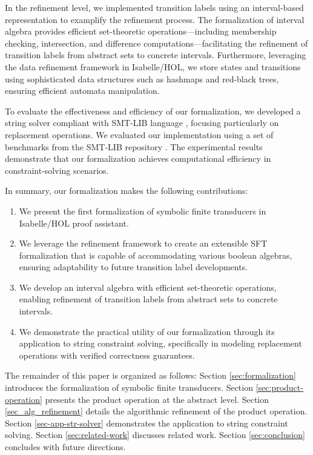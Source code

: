 In the refinement level, we implemented transition labels using an interval-based representation to examplify the refinement process. The formalization of interval algebra provides efficient set-theoretic operations—including membership checking, intersection, and difference computations—facilitating the refinement of transition labels from abstract sets to concrete intervals. Furthermore, leveraging the data refinement framework \cite{DBLP:conf/itp/Lammich13} in Isabelle/HOL, we store states and transitions using sophisticated data structures such as hashmaps and red-black trees, ensuring efficient automata manipulation.

To evaluate the effectiveness and efficiency of our formalization, we developed a string solver compliant with SMT-LIB language \cite{smtlib}, focusing particularly on replacement operations. We evaluated our implementation using a set of benchmarks from the SMT-LIB repository \cite{smtlib_benchmarks}. The experimental results demonstrate that our formalization achieves computational efficiency in constraint-solving scenarios.



In summary, our formalization makes the following contributions:
\begin{enumerate}
\item We present the first formalization of symbolic finite transducers in Isabelle/HOL proof assistant.
\item We leverage the refinement framework to create an extensible SFT formalization that is capable of accommodating various boolean algebras, ensuring adaptability to future transition label developments.
\item We develop an interval algebra with efficient set-theoretic operations, enabling refinement of transition labels from abstract sets to concrete intervals.
\item We demonstrate the practical utility of our formalization through its application to string constraint solving, specifically in modeling replacement operations with verified correctness guarantees.
\end{enumerate}

The remainder of this paper is organized as follows:
Section \ref{sec:formalization} introduces the formalization of symbolic finite transducers.
Section \ref{sec:product-operation} presents the product operation at the abstract level.
Section \ref{sec_alg_refinement} details the algorithmic refinement of the product operation.
Section \ref{sec-app-str-solver} demonstrates the application to string constraint solving.
Section \ref{sec:related-work} discusses related work.
Section \ref{sec:conclusion} concludes with future directions.